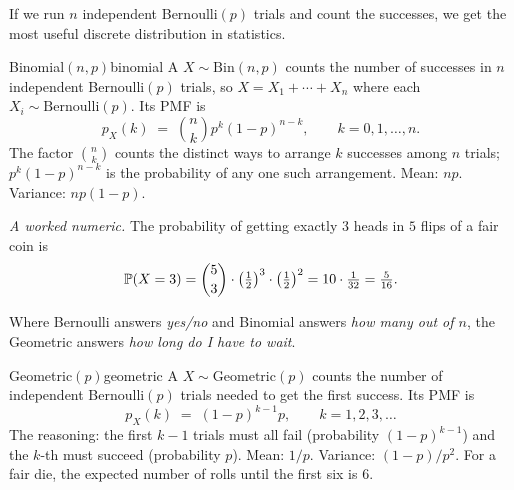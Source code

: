 If we run $n$ independent Bernoulli$(p)$ trials and count the successes, we get the most useful discrete distribution in statistics.

\begin{example}{Binomial$(n, p)$}{binomial}
A  $X \sim \mathrm{Bin}(n, p)$ counts the number of successes in $n$ independent Bernoulli$(p)$ trials, so $X = X_1 + \cdots + X_n$ where each $X_i \sim \mathrm{Bernoulli}(p)$. Its PMF is
\[
p_X(k) \;=\; \binom{n}{k} p^k (1 - p)^{n - k}, \qquad k = 0, 1, \ldots, n.
\]
The factor $\binom{n}{k}$ counts the distinct ways to arrange $k$ successes among $n$ trials; $p^k (1 - p)^{n - k}$ is the probability of any one such arrangement. Mean: $np$. Variance: $np(1 - p)$.

\textit{A worked numeric.} The probability of getting exactly $3$ heads in $5$ flips of a fair coin is
\[
\mathbb{P}(X = 3) = \binom{5}{3} \cdot \left(\tfrac{1}{2}\right)^3 \cdot \left(\tfrac{1}{2}\right)^2 = 10 \cdot \tfrac{1}{32} = \tfrac{5}{16}.
\]
\end{example}



Where Bernoulli answers \emph{yes/no} and Binomial answers \emph{how many out of $n$}, the Geometric answers \emph{how long do I have to wait}.

\begin{example}{Geometric$(p)$}{geometric}
A  $X \sim \mathrm{Geometric}(p)$ counts the number of independent Bernoulli$(p)$ trials needed to get the first success. Its PMF is
\[
p_X(k) \;=\; (1 - p)^{k - 1} p, \qquad k = 1, 2, 3, \ldots
\]
The reasoning: the first $k - 1$ trials must all fail (probability $(1-p)^{k-1}$) and the $k$-th must succeed (probability $p$). Mean: $1/p$. Variance: $(1-p)/p^2$. For a fair die, the expected number of rolls until the first six is $6$.
\end{example}



